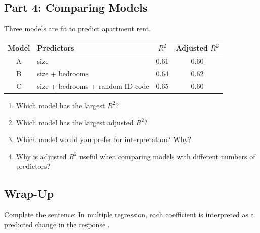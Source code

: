 \documentclass{article}
\newcommand{\blankline}[1]{\underline{\hspace{#1}}}
\begin{document}
\subsection*{Part 4: Comparing Models}
Three models are fit to predict apartment rent.

\begin{center}
\renewcommand{\arraystretch}{1.35}
\begin{tabular}{clcc}
\toprule
\textbf{Model} & \textbf{Predictors} & \boldmath$R^2$ & \textbf{Adjusted }\boldmath$R^2$ \\
\midrule
A & size & 0.61 & 0.60 \\
B & size + bedrooms & 0.64 & 0.62 \\
C & size + bedrooms + random ID code & 0.65 & 0.60 \\
\bottomrule
\end{tabular}
\end{center}

\begin{enumerate}[label={\bfseries (\Alph*)},itemsep=.8em]
\item Which model has the largest $R^2$? \\[2em]
\item Which model has the largest adjusted $R^2$? \\[2em]
\item Which model would you prefer for interpretation? Why? \\[4em]
\item Why is adjusted $R^2$ useful when comparing models with different numbers of predictors? \\[4em]
\end{enumerate}

\subsection*{Wrap-Up}
Complete the sentence: In multiple regression, each coefficient is interpreted as a predicted change in the response \blankline{3.3in}. \\[3em]
\end{document}

